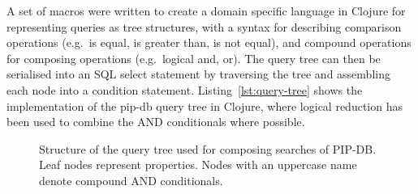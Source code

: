 A set of macros were written to create a domain specific language in
Clojure for representing queries as tree structures, with a syntax for
describing comparison operations (e.g.\ is equal, is greater than, is
not equal), and compound operations for composing operations
(e.g.\ logical and, or). The query tree can then be serialised into an
SQL select statement by traversing the tree and assembling each node
into a condition statement. Listing~\ref{lst:query-tree} shows the
implementation of the pip-db query tree in Clojure, where logical
reduction has been used to combine the AND conditionals where
possible.


\begin{figure}[H]
\centering
{}
\caption[Structure of the query tree for composing searches]
        {Structure of the query tree used for composing searches of
          PIP-DB. Leaf nodes represent properties. Nodes
          with an uppercase name denote compound AND conditionals.}
\label{fig:query-tree}
\end{figure}



\newpage

